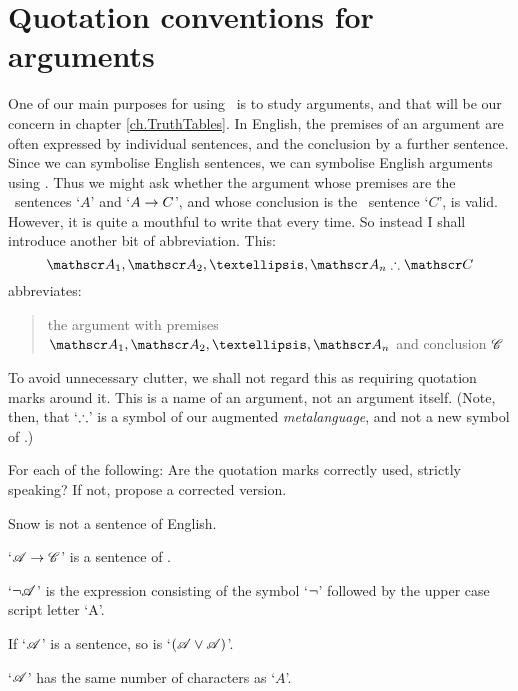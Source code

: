 \section{Quotation conventions for arguments}
One of our main purposes for using \TFL\ is to study arguments, and that will be our concern in chapter \ref{ch.TruthTables}. In English, the premises of an argument are often expressed by individual sentences, and the conclusion by a further sentence. Since we can symbolise English sentences, we can symbolise English arguments using \TFL. Thus we might ask whether the argument whose premises are the \TFL\ sentences `$A$' and `$A \rightarrow C$', and whose conclusion is the \TFL\ sentence `$C$', is valid. However, it is quite a mouthful to write that every time. So instead I shall introduce another bit of abbreviation. This:
	$$\meta{A}_1, \meta{A}_2, …, \meta{A}_n \ttherefore \meta{C}$$
abbreviates:
	\begin{quote}
		the argument with premises $\meta{A}_1, \meta{A}_2, …, \meta{A}_n$ and conclusion $\mathscr{C}$
	\end{quote}
To avoid unnecessary clutter, we shall not regard this as requiring quotation marks around it. This is a name of an argument, not an argument itself. (Note, then, that `$\mathrel{\therefore}$' is a symbol of our augmented \emph{metalanguage}, and not a new symbol of \TFL.)



\practiceproblems

\solutions
\problempart
\label{pr.usemention}
For each of the following: Are the quotation marks correctly used, strictly speaking? If not, propose a corrected version.
\begin{earg}
\item Snow is not a sentence of English.
\item `$\mathscr{A} \rightarrow \mathscr{C}$' is a sentence of \TFL.
\item `$\neg\mathscr{A}$' is the expression consisting of the symbol `$\neg$' followed by the upper case script letter `A'. %
\item If `$\mathscr{A}$' is a sentence, so is `$(\mathscr{A} \vee \mathscr{A})$'. %
\item `$\mathscr{A}$' has the same number of characters as `$A$'.
\end{earg}
